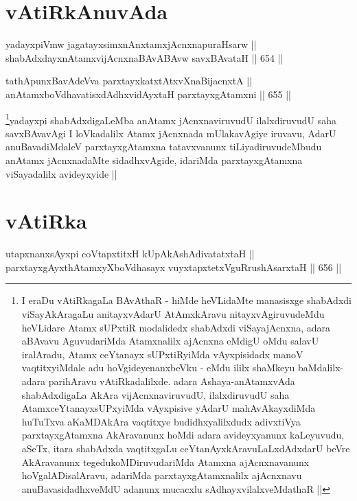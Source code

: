 \section*{vAtiRkAnuvAda}

\begin{shl}
yadayxpiVmw jagatayxsimxnAnxtamxjAcnxnapuraHsarw || \\
shabAdxdayxnAtamxvijAcnxnaBAvABAvw savxBAvataH ||  654 ||  
\end{shl}
				
\begin{shl}
tathA\s punxBavAdeVva parxtayxkatxtAtxvXnaBijacnxtA || \\
anAtamxboVdhavatisxdAdhx\s vidAyx\s taH parxtayxgAtamxni ||  655 ||  
\end{shl}

\begin{artha}
\footnote{I eraDu vAtiRkagaLa BAvAthaR - hiMde heVLidaMte manasisxge
  shabAdxdi viSayAkAragaLu anitayxvAdarU AtAmxkAravu
  nitayxvAgiruvudeMdu heVLidare Atamx sUPxtiR modalidedx shabAdxdi
  viSayajAcnxna, adara aBAvavu AguvudariMda Atamxnalilx ajAcnxna
  eMdigU oMdu salavU iralAradu, Atamx ceYtanayx sUPxtiRyiMda
  vAyxpisidadx manoV vaqtitxyiMdale adu hoVgideyenanxbeVku - eMdu
  ililx  shaMkeyu baMdalilx-adara parihAravu vAtiRkadalilxde. adara
  Ashaya-anAtamxvAda shabAdxdigaLa AkAra vijAcnxnaviruvudU,
  ilalxdiruvudU saha AtamxceYtanayxsUPxyiMda vAyxpisive yAdarU
  mahAvAkayxdiMda huTuTxva aKaMDAkAra vaqtitxye budidhxyalilxdudx
  adivxtiVya parxtayxgAtamxna AkAravanunx hoMdi adara avideyxyanunx
  kaLeyuvudu, aSeTx, itara shabAdxda vaqtitxgaLu
  ceYtanAyxkAravuLaLxdAdxdarU beVre AkAravanunx tegedukoMDiruvudariMda
  Atamxna ajAcnxnavanunx hoVgalADisalAravu, adariMda
  parxtayxgAtamxnalilx ajAcnxnavu anuBavasidadhxveMdU adanunx mucacxlu
  sAdhayxvilalxveMdathaR ||}yadayxpi shabAdxdigaLeMba anAtamx jAcnxnaviruvudU
ilalxdiruvudU saha savxBAvavAgi I loVkadalilx Atamx jAcnxnada
mUlakavAgiye iruvavu, AdarU anuBavadiMdaleV parxtayxgAtamxna
tatavxvanunx tiLiyadiruvudeMbudu anAtamx jAcnxnadaMte sidadhxvAgide,
idariMda parxtayxgAtamxna viSayadalilx avideyxyide ||
\end{artha}

\section*{vAtiRka}

\stext

\begin{shl}
utapxnanxsAyxpi coVtapxtitxH kUpAkAshAdivatatxtaH ||  \\
parxtayxgAyxthAtamxyXboVdhasayx vuyxtapxtetxVguRrushAsarxtaH ||  656 ||  
\end{shl}

